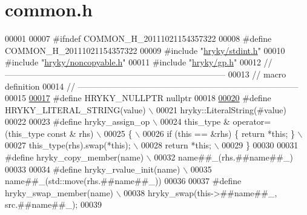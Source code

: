 \hypertarget{common_8h_source}{\section{common.\-h}
}

\begin{DoxyCode}
00001 
00007 \textcolor{preprocessor}{#ifndef COMMON\_H\_20111021154357322}
00008 \textcolor{preprocessor}{}\textcolor{preprocessor}{#define COMMON\_H\_20111021154357322}
00009 \textcolor{preprocessor}{}\textcolor{preprocessor}{#include "\hyperlink{stdint_8h}{hryky/stdint.h}"}
00010 \textcolor{preprocessor}{#include "\hyperlink{noncopyable_8h}{hryky/noncopyable.h}"}
00011 \textcolor{preprocessor}{#include "\hyperlink{gp_8h}{hryky/gp.h}"}
00012 \textcolor{comment}{//
      ------------------------------------------------------------------------------}
00013 \textcolor{comment}{// macro definition}
00014 \textcolor{comment}{//
      ------------------------------------------------------------------------------}
00015 
\hypertarget{common_8h_source_l00017}{}\hyperlink{common_8h_a4cd4ac09cfcdbd6b30ee69afc156e210}{00017} \textcolor{preprocessor}{#define HRYKY\_NULLPTR   nullptr}
00018 \textcolor{preprocessor}{}
\hypertarget{common_8h_source_l00020}{}\hyperlink{common_8h_a9ab2728caa46163f328bd32fe4d9ff12}{00020} \textcolor{preprocessor}{#define HRYKY\_LITERAL\_STRING(value) \(\backslash\)}
00021 \textcolor{preprocessor}{    hryky::LiteralString(#value)}
00022 \textcolor{preprocessor}{}
00023 \textcolor{preprocessor}{#define hryky\_assign\_op \(\backslash\)}
00024 \textcolor{preprocessor}{    this\_type & operator=(this\_type const & rhs) \(\backslash\)}
00025 \textcolor{preprocessor}{    \{ \(\backslash\)}
00026 \textcolor{preprocessor}{        if (this == &rhs) \{ return *this; \} \(\backslash\)}
00027 \textcolor{preprocessor}{        this\_type(rhs).swap(*this); \(\backslash\)}
00028 \textcolor{preprocessor}{        return *this; \(\backslash\)}
00029 \textcolor{preprocessor}{    \}}
00030 \textcolor{preprocessor}{}
00031 \textcolor{preprocessor}{#define hryky\_copy\_member(name) \(\backslash\)}
00032 \textcolor{preprocessor}{    name##\_(rhs.##name##\_)}
00033 \textcolor{preprocessor}{}
00034 \textcolor{preprocessor}{#define hryky\_rvalue\_init(name) \(\backslash\)}
00035 \textcolor{preprocessor}{    name##\_(std::move(rhs.##name##\_))}
00036 \textcolor{preprocessor}{}
00037 \textcolor{preprocessor}{#define hryky\_swap\_member(name) \(\backslash\)}
00038 \textcolor{preprocessor}{    hryky\_swap(this->##name##\_, src.##name##\_);}
00039 \textcolor{preprocessor}{}

\end{DoxyCode}

